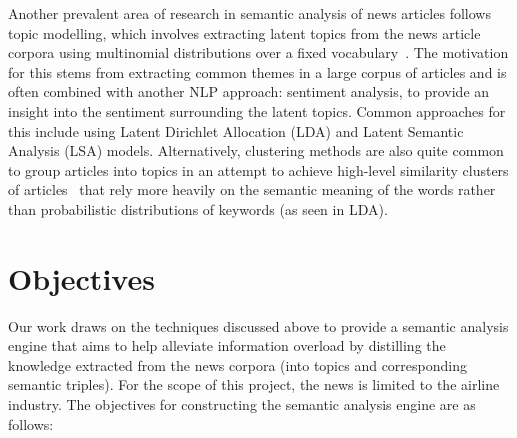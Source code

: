 Another prevalent area of research in semantic analysis of news articles follows topic modelling, which involves extracting latent topics from the news article corpora using multinomial distributions over a fixed vocabulary~\cite{nouns_only_lda}. The motivation for this stems from extracting common themes in a large corpus of articles and is often combined with another NLP approach: sentiment analysis, to provide an insight into the sentiment surrounding the latent topics. Common approaches for this include using Latent Dirichlet Allocation (LDA) and Latent Semantic Analysis (LSA) models. Alternatively, clustering methods are also quite common to group articles into topics in an attempt to achieve high-level similarity clusters of articles~\cite{clustering_intro} that rely more heavily on the semantic meaning of the words rather than probabilistic distributions of keywords (as seen in LDA).

\section{Objectives} \label{objectives}

Our work draws on the techniques discussed above to provide a semantic analysis engine that aims to help alleviate information overload by distilling the knowledge extracted from the news corpora (into topics and corresponding semantic triples). For the scope of this project, the news is limited to the airline industry. The objectives for constructing the semantic analysis engine are as follows:



